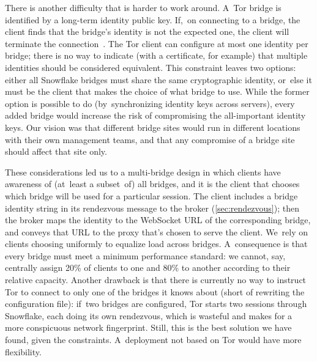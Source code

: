 \documentclass[letterpaper,twocolumn]{article}
\begin{document}
There is another difficulty that is harder to work around.
A~Tor bridge is identified
by a long-term identity public key.
If,~on connecting to a bridge,
the client finds that the bridge's identity is not the expected one,
the client will terminate the connection~\cite[\S 4.2]{tor-spec}.
The Tor client can configure at most one identity per bridge;
there is no way to indicate (with a certificate, for example)
that multiple identities should be considered equivalent.
This constraint leaves two options:
either all Snowflake bridges must share the same cryptographic identity,
or~else it must be the client that makes the choice of what bridge to use.
While the former option is possible to do
(by~synchronizing identity keys across servers),
every added bridge would increase the risk of compromising
the all-important identity keys.
Our vision was that different bridge sites
would run in different locations
with their own management teams,
and that any compromise of a bridge site
should affect that site only.

These considerations led us to a multi-bridge design
in which clients have awareness of (at~least a subset~of) all bridges,
and it is the client that chooses which bridge will be used
for a particular session.
The client includes a bridge identity string
in its rendezvous message to the broker (\autoref{sec:rendezvous});
then the broker maps the identity to the WebSocket URL
of the corresponding bridge,
and conveys that URL to the proxy
that's chosen to serve the client.
We~rely on clients choosing uniformly
to equalize load across bridges.
A~consequence is that
every bridge must meet a minimum performance standard:
we cannot, say,
centrally assign 20\% of clients to one and 80\% to another
according to their relative capacity.
Another drawback is that there is currently no way to instruct Tor
to connect to only one of the bridges it knows about
(short of rewriting the configuration file):
if~two bridges are configured, Tor starts two sessions through Snowflake,
each doing its own rendezvous,
which is wasteful and makes for a more conspicuous network fingerprint.
Still, this is the best solution we have found, given the constraints.
A~deployment not based on Tor
would have more flexibility.
\end{document}
